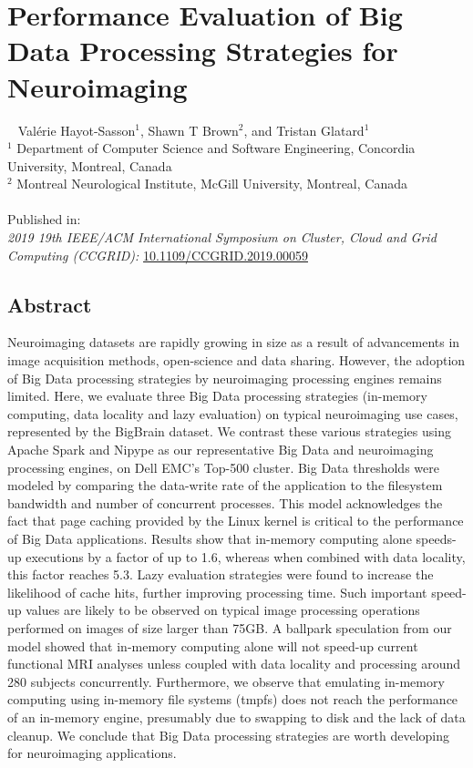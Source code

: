 \chapter{Performance Evaluation of Big Data Processing Strategies for Neuroimaging}~\label{chp:bigdatastrategies}
Val\'erie Hayot-Sasson$^{1}$, Shawn T Brown$^{2}$, and Tristan Glatard$^{1}$ \\
\begingroup \footnotesize
$^1$ Department of Computer Science and Software Engineering, Concordia University, Montreal, Canada \\
$^2$ Montreal Neurological Institute, McGill University, Montreal, Canada \\
\endgroup 
\vspace{5pt} \\
Published in: \\
\hspace*{10pt} \textit{2019 19th IEEE/ACM International Symposium on Cluster, Cloud and Grid Computing (CCGRID):} \url{10.1109/CCGRID.2019.00059}
\section{Abstract}
    Neuroimaging datasets are rapidly growing in size as a result of 
    advancements in image acquisition methods, open-science and data sharing. 
    However, the adoption of Big Data processing strategies by neuroimaging
    processing engines remains limited. Here, we 
    evaluate three Big Data processing strategies (in-memory computing, 
    data locality and lazy evaluation) on typical neuroimaging use 
    cases, represented by the BigBrain dataset. We contrast these various 
    strategies using Apache Spark and Nipype as our 
    representative Big Data and neuroimaging processing engines, on Dell EMC's 
    Top-500 cluster. 
    Big Data thresholds were modeled by comparing the data-write rate of the 
    application to the filesystem bandwidth and number of concurrent processes. 
    This model acknowledges the 
fact that page caching provided by the Linux kernel is critical to the 
performance of Big Data applications. Results show that in-memory 
computing alone speeds-up executions by a factor of up to 1.6, whereas 
when combined with data locality, this factor reaches 5.3. Lazy evaluation
strategies
were found to increase the likelihood of cache hits, further improving
    processing time. Such important 
speed-up values are likely to be observed on typical image processing 
operations performed on images of size larger than 75GB. A ballpark 
speculation from our model showed that in-memory computing alone will
not speed-up current 
functional MRI analyses unless coupled with data 
locality and processing around 280 subjects concurrently. Furthermore, we observe
    that emulating in-memory computing 
using in-memory file systems (tmpfs) does not reach the performance of an in-memory engine,
    presumably due to swapping to disk and the lack of data cleanup.
We conclude that Big Data processing strategies are 
worth developing for neuroimaging 
applications. 


